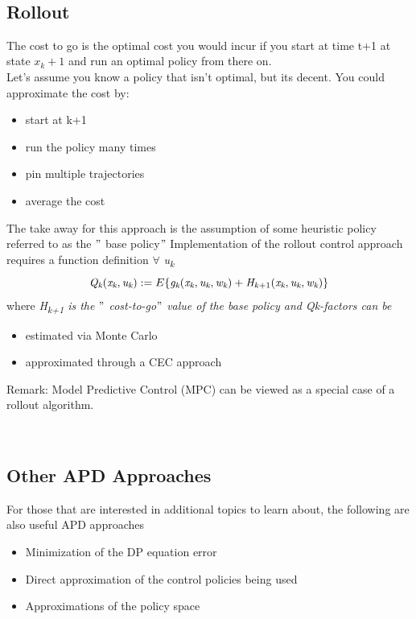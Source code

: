 \documentclass[twoside]{article}
\begin{document}
\\ \subsection{Rollout}
The cost to go is the optimal cost you would incur if you start at time t+1 at state $x_k +1$ and run an optimal policy from there on.\\
Let's assume you know a policy that isn't optimal, but its decent.  You could approximate the cost by:
\begin{itemize}
    \item start at k+1 
    \item run the policy many times
    \item pin multiple trajectories
    \item average the cost
\end{itemize}
The take away for this approach is the assumption of some heuristic policy referred to as the $"$ base policy$"$  Implementation of the rollout control approach requires a function definition $ \forall $ \textit{u\textsubscript{k}} $$
\textit{Q\textsubscript{k}}(\textit{x\textsubscript{k}}, \textit{u\textsubscript{k}}) := E  \{  \textit{g\textsubscript{k}}(\textit{x\textsubscript{k}}, \textit{u\textsubscript{k}}, \textit{w\textsubscript{k}}) + \textit{H\textsubscript{k}}\textsubscript{+1}(\textit{x\textsubscript{k}}, \textit{u\textsubscript{k}}, \textit{w\textsubscript{k}}) \}$$ where \textit{H\textsubscript{k+1} is the $"$ cost-to-go$"$  value of the base policy and Qk-factors can be}
\begin{itemize}
    \item estimated via Monte Carlo
    \item approximated through a CEC approach
\end{itemize}
Remark: Model Predictive Control (MPC) can be viewed as a special case of a rollout algorithm.



\\ \subsection{Other APD Approaches}
For those that are interested in additional topics to learn about, the following are also useful APD approaches
\begin{itemize}
    \item Minimization of the DP equation error
    \item Direct approximation of the control policies being used
    \item Approximations of the policy space
\end{itemize}
\end{document}
